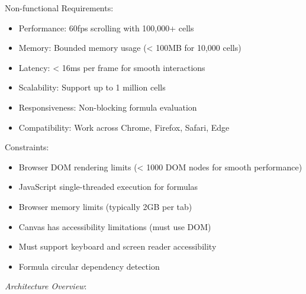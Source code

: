\documentclass[11pt]{article}
\begin{document}
Non-functional Requirements:

\begin{itemize}
\item Performance: 60fps scrolling with 100,000+ cells
\item Memory: Bounded memory usage (< 100MB for 10,000 cells)
\item Latency: < 16ms per frame for smooth interactions
\item Scalability: Support up to 1 million cells
\item Responsiveness: Non-blocking formula evaluation
\item Compatibility: Work across Chrome, Firefox, Safari, Edge
\end{itemize}

Constraints:

\begin{itemize}
\item Browser DOM rendering limits (< 1000 DOM nodes for smooth performance)
\item JavaScript single-threaded execution for formulas
\item Browser memory limits (typically 2GB per tab)
\item Canvas has accessibility limitations (must use DOM)
\item Must support keyboard and screen reader accessibility
\item Formula circular dependency detection
\end{itemize}

\emph{Architecture Overview}:
\end{document}
